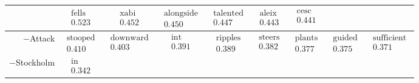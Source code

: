 \documentclass[10pt, a4paper]{UUThesisTemplate}
\begin{document}
\begin{table}
\begin{tabular}{r|c c c c c c c c}
& $ \begin{matrix} \text{fells} \\ 0.523 \end{matrix}$
& $ \begin{matrix} \text{xabi} \\ 0.452 \end{matrix}$
& $ \begin{matrix} \text{alongside} \\ 0.450 \end{matrix}$
& $ \begin{matrix} \text{talented} \\ 0.447 \end{matrix}$
& $ \begin{matrix} \text{aleix} \\ 0.443 \end{matrix}$
& $ \begin{matrix} \text{cesc} \\ 0.441 \end{matrix}$
\\\hline
$-$Attack
& $ \begin{matrix} \text{stooped} \\ 0.410 \end{matrix}$
& $ \begin{matrix} \text{downward} \\ 0.403 \end{matrix}$
& $ \begin{matrix} \text{int} \\ 0.391 \end{matrix}$
& $ \begin{matrix} \text{ripples} \\ 0.389 \end{matrix}$
& $ \begin{matrix} \text{steers} \\ 0.382 \end{matrix}$
& $ \begin{matrix} \text{plants} \\ 0.377 \end{matrix}$
& $ \begin{matrix} \text{guided} \\ 0.375 \end{matrix}$
& $ \begin{matrix} \text{sufficient} \\ 0.371 \end{matrix}$
\\\hline
$-$Stockholm
& $ \begin{matrix} \text{in} \\ 0.342 \end{matrix}$

\end{tabular}
\end{table}
\end{document}

